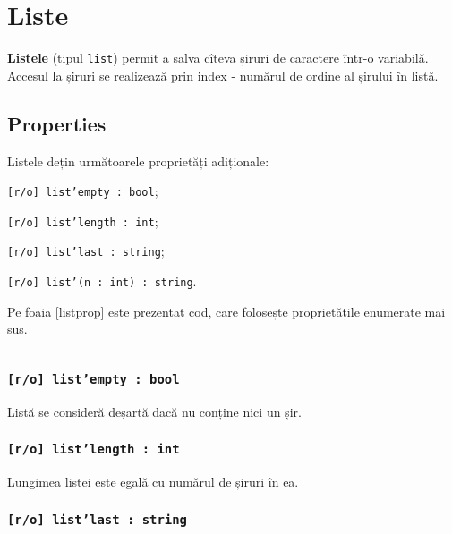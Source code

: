 \section{Liste}

{\bf Listele} (tipul \texttt{list}) permit a salva cîteva șiruri de caractere într-o variabilă. Accesul la șiruri se realizează prin index - numărul de ordine al șirului în listă.

\subsection{Properties}

Listele dețin următoarele proprietăți adiționale:
\begin{icItems}
\item
	\texttt{[r/o] list'empty : bool};
\item
	\texttt{[r/o] list'length : int};
\item
	\texttt{[r/o] list'last : string};
\item
	\texttt{[r/o] list'(n : int) : string}.
\end{icItems}

Pe foaia \ref{listprop} este prezentat cod, care folosește proprietățile enumerate mai sus.

\begin{sourcecode}
    \label{listprop}
    \inputminted[linenos]{icl}{../sources/listprop.icL}
\end{sourcecode}

\subsubsection{\texttt{[r/o] list'empty : bool}}

Listă se consideră deșartă dacă nu conține nici un șir.

\subsubsection{\texttt{[r/o] list'length : int}}

Lungimea listei este egală cu numărul de șiruri în ea.

\subsubsection{\texttt{[r/o] list'last : string}}

